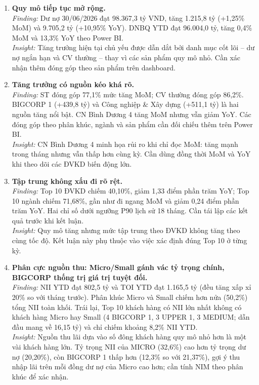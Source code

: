 \documentclass[12pt]{eDA_conquer2026}
\begin{document}
\begin{enumerate}[label=\textbf{\arabic*.}, leftmargin=0.8cm]

\item \textbf{Quy mô tiếp tục mở rộng.}\\
    \textit{Finding:} Dư nợ 30/06/2026 đạt 98.367,3 tỷ VND, tăng 1.215,8 tỷ (+1,25\% MoM) và 9.705,2 tỷ (+10,95\% YoY). DNBQ YTD đạt 96.004,0 tỷ, tăng 0,4\% MoM và 13,3\% YoY theo Power BI.\\
    \textit{Insight:} Tăng trưởng hiện tại chủ yếu được dẫn dắt bởi danh mục cốt lõi – dư nợ ngắn hạn và CV thường – thay vì các sản phẩm quy mô nhỏ. Cần xác nhận thêm đóng góp theo sản phẩm trên dashboard.

\item \textbf{Tăng trưởng có nguồn kéo khá rõ.}\\
    \textit{Finding:} ST đóng góp 77,1\% mức tăng MoM; CV thường đóng góp 86,2\%. BIGCORP 1 (+439,8 tỷ) và Công nghiệp \& Xây dựng (+511,1 tỷ) là hai nguồn tăng nổi bật. CN Bình Dương 4 tăng MoM nhưng vẫn giảm YoY. Các đóng góp theo phân khúc, ngành và sản phẩm cần đối chiếu thêm trên Power BI.\\
    \textit{Insight:} CN Bình Dương 4 minh họa rủi ro khi chỉ đọc MoM: tăng mạnh trong tháng nhưng vẫn thấp hơn cùng kỳ. Cần dùng đồng thời MoM và YoY khi theo dõi các ĐVKD biến động lớn.

\item \textbf{Tập trung không xấu đi rõ rệt.}\\
    \textit{Finding:} Top 10 ĐVKD chiếm 40,10\%, giảm 1,33 điểm phần trăm YoY; Top 10 ngành chiếm 71,68\%, gần như đi ngang MoM và giảm 0,24 điểm phần trăm YoY. Hai chỉ số dưới ngưỡng P90 lịch sử 18 tháng. Cần tái lập các kết quả trước khi kết luận.\\
    \textit{Insight:} Quy mô tăng nhưng mức tập trung theo ĐVKD không tăng theo cùng tốc độ. Kết luận này phụ thuộc vào việc xác định đúng Top 10 ở từng kỳ.

\item \textbf{Phân cực nguồn thu: Micro/Small gánh vác tỷ trọng chính, BIGCORP thống trị giá trị tuyệt đối.}\\
    \textit{Finding:} NII YTD đạt 802,5 tỷ và TOI YTD đạt 1.165,5 tỷ (đều tăng xấp xỉ 20\% so với tháng trước). Phân khúc Micro và Small chiếm hơn nửa (50,2\%) tổng NII toàn khối. Trái lại, Top 10 khách hàng có NII lớn nhất không có khách hàng Micro hay Small (4 BIGCORP 1, 3 UPPER 1, 3 MEDIUM; dẫn đầu mang về 16,15 tỷ) và chỉ chiếm khoảng 8,2\% NII YTD.\\
    \textit{Insight:} Nguồn thu lãi dựa vào số đông khách hàng quy mô nhỏ hơn là một vài khách hàng lớn. Tỷ trọng NII của MICRO (32,6\%) cao hơn tỷ trọng dư nợ (20,20\%), còn BIGCORP 1 thấp hơn (12,3\% so với 21,37\%), gợi ý thu nhập lãi trên mỗi đồng dư nợ của Micro cao hơn; cần tính NIM theo phân khúc để xác nhận.


\end{enumerate}
\end{document}
